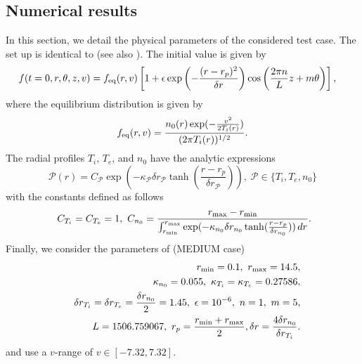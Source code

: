 \subsection{Numerical results \label{subsec:driftkinetic-results}}

In this section, we detail the physical parameters of the considered test case. The set up is identical to \cite{cep} (see also 
\cite{BC2013, vlasovia}). The initial value is given by 
\begin{align*}
f(t=0,r,\theta,z,v) &=
f_{\rm eq}(r,v)\left[1+\epsilon \exp\left(-\frac{(r-r_p)^2}{\delta r}\right)\cos\left(\frac{2\pi n}{L}z+m\theta\right)\right],
\end{align*}
where the equilibrium distribution is given by
\begin{equation} \label{eq:equilibrium}
f_{\rm eq}(r,v)=\frac{n_0(r)\exp(-\frac{v^2}{2T_i(r)})}{(2\pi T_i(r))^{1/2}}.
\end{equation}
The radial profiles $T_i$, $T_e$, and $n_0$ have the analytic expressions
$$
\mathcal{P}(r) = C_\mathcal{P}\exp\left(-\kappa_\mathcal{P}\delta r_{\mathcal{P}}\tanh(\frac{r-r_p}{\delta r_{\mathcal{P}}})\right), \; \mathcal{P}\in \{T_i,T_e,n_0\}
$$
with the constants defined as follows
$$
\ C_{T_i}=C_{T_e}=1,\ C_{n_0}=\frac{r_{\rm max}-r_{\rm min}}{
\int_{r_{\rm min}}^{r_{\rm max}}\exp(-\kappa_{n_0}\delta r_{n_0}\tanh(\frac{r-r_p}{\delta r_{n_0}}))\,dr}.
$$
Finally, we consider the parameters of \cite{BC2013} (MEDIUM case)
\begin{eqnarray*}
&&r_{\rm min} = 0.1,\ r_{\rm max} = 14.5,\\
&& \kappa_{n_0}= 0.055,\ \kappa_{T_i}=\kappa_{T_e}= 0.27586,\\
&&\delta r_{T_i}=\delta r_{T_e}=\frac{\delta r_{n_0}}{2}= 1.45,\ \epsilon=10^{-6},\ n=1,\ m=5,\\
&&L=1506.759067,\ r_p = \frac{r_{\rm min}+r_{\rm max}}{2},\delta r = \frac{4 \delta r_{n_0}}{\delta r_{T_i}}.
\end{eqnarray*}
and use a $v$-range of $v \in [-7.32,7.32]$.

